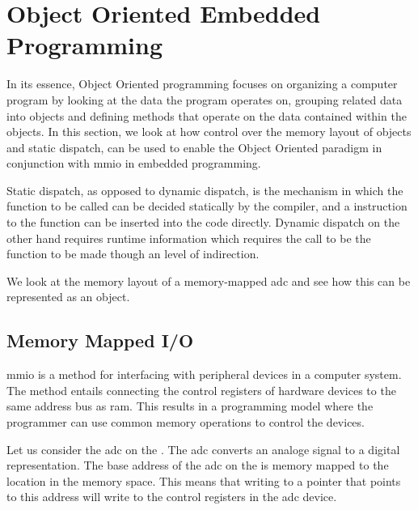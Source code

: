 \section{Object Oriented Embedded Programming}
\label{sec:impl:oo}

In its essence, Object Oriented programming focuses on organizing a computer program by looking at the data the program operates on, grouping related data into objects and defining methods that operate on the data contained within the objects.
In this section, we look at how control over the memory layout of objects and static dispatch, can be used to enable the Object Oriented paradigm in conjunction with \gls{mmio} in embedded programming.

Static dispatch, as opposed to dynamic dispatch, is the mechanism in which the function to be called can be decided statically by the compiler, and a  instruction to the function can be inserted into the code directly.
Dynamic dispatch on the other hand requires runtime information which requires the call to be the function to be made though an level of indirection.

We look at the memory layout of a memory-mapped \gls{adc} and see how this can be represented as an object.

\subsection{Memory Mapped I/O}
\label{ssec:memory_mapped_io}

\gls{mmio} is a method for interfacing with peripheral devices in a computer system.
The method entails connecting the control registers of hardware devices to the same address bus as \gls{ram}.
This results in a programming model where the programmer can use common memory operations to control the devices.

Let us consider the \gls{adc} on the {\gecko}.
The \gls{adc} converts an analoge signal to a digital representation.
The base address of the \gls{adc} on the {\gecko} is memory mapped to the location  in the memory space.
This means that writing to a pointer that points to this address will write to the control registers in the \gls{adc} device.

